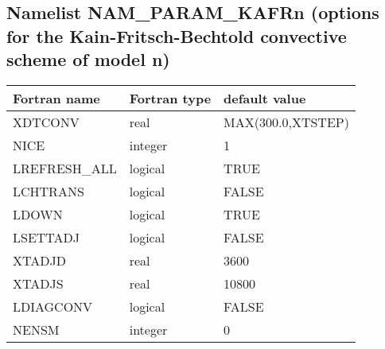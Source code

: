 \subsection{Namelist NAM\_PARAM\_KAFRn (options for the Kain-Fritsch-Bechtold convective
scheme of model n)}


\begin{center}
\begin{tabular} {|l|l|l|}
\hline
Fortran name & Fortran type & default value \\
\hline
XDTCONV      &  real         & MAX(300.0,XTSTEP) \\
NICE         &  integer      &   1               \\
LREFRESH\_ALL&  logical      &   TRUE            \\
LCHTRANS     &  logical      &   FALSE           \\
LDOWN        &  logical      &   TRUE            \\
LSETTADJ     &  logical      &   FALSE           \\
XTADJD       &  real         &   3600            \\
XTADJS       &  real         &  10800            \\
LDIAGCONV    &  logical      &   FALSE           \\
NENSM        &  integer      &     0             \\
\hline
\end{tabular}
\end{center}

